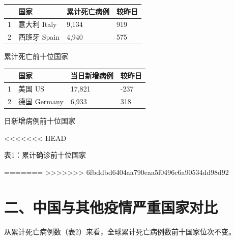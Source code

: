 \documentclass[11,]{article}
\begin{document}
\begin{minipage}{\textwidth}
        \begin{minipage}[t]{0.5\textwidth}
            \centering
            \begin{tabular}{llll}
            \hline
             & 国家        & 累计死亡病例 & 较昨⽇ \\
            \hline
            1 & 意⼤利 Italy & 9,134  & 919 \\
            2 & 西班⽛ Spain & 4,940  & 575 \\
            \hline
            \end{tabular}
            \makeatletter{}\makeatother\caption{累计死亡前十位国家}
        \end{minipage}
        \begin{minipage}[t]{0.5\textwidth}
            \centering
            \begin{tabular}{llll}
            \hline
              & 国家         & 当⽇新增病例 & 较昨日  \\
            \hline
            1 & 美国 US      & 17,821 & -237 \\
            2 & 德国 Germany & 6,933  & 318 \\
            \hline
        \end{tabular}
      \makeatletter{}\makeatother\caption{⽇新增病例前十位国家}
    \end{minipage}
\end{minipage}

\textless{}\textless{}\textless{}\textless{}\textless{}\textless{}\textless{}
HEAD

\textcolor{glaucous}{表1：累计确诊前十位国家}

=======
\textgreater{}\textgreater{}\textgreater{}\textgreater{}\textgreater{}\textgreater{}\textgreater{}
6fbddbd6404aa790eaa5f0496c6a90534dd98d92

\hypertarget{section-3}{%
\section{\texorpdfstring{\textcolor{glaucous}{二、中国与其他疫情严重国家对比}}{}}\label{section-3}}

从累计死亡病例数（表2）来看，全球累计死亡病例数前十国家位次不变。
\end{document}
